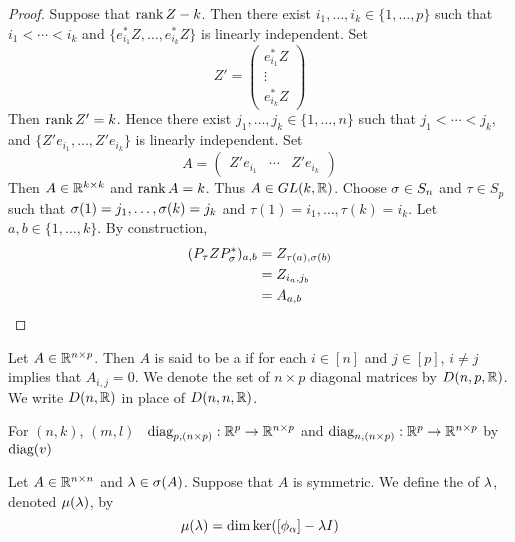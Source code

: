 \documentclass{book}
\begin{document}
	\begin{proof}
		Suppose that $\operatorname{\text{rank}} Z - k$. Then there exist $i_1, \ldots, i_k \in \{1, \ldots, p\}$ such that $i_1 < \cdots < i_k$ and $\{	e_{i_1}^* Z, \ldots, e_{i_k}^* Z \}$ is linearly independent. Set 
		$$ Z' = 
		\begin{pmatrix}
			e_{i_1}^* Z \\
			\vdots \\
			e_{i_k}^* Z 
		\end{pmatrix}
		$$
		Then $\operatorname{\text{rank}} Z' = k$. Hence there exist $j_1, \ldots, j_k \in \{1, \ldots, n\}$ such that $j_1 < \cdots < j_k$, and $\{Z' e_{i_1}, \ldots, Z' e_{i_k} \}$ is linearly independent. Set 
		$$ A = 
		\begin{pmatrix}
			Z' e_{i_1} & \cdots & Z' e_{i_k}
		\end{pmatrix}
		$$
		Then $A \in \mathbb{R}^{k \times k}$ and $\operatorname{\text{rank}} A = k$. Thus $A \in GL(k, \mathbb{R})$. Choose $\sigma \in S_n$ and $\tau \in S_p$ such that $\sigma(1) = j_1, \ldots, \sigma(k) = j_k$ and $\tau(1) = i_1, \ldots, \tau(k) = i_k$. Let $a,b \in \{1, \ldots, k\}$. By construction, 
		\begin{align*}
			(P_{\tau} Z P^*_{\sigma})_{a, b}
			& = Z_{\tau(a), \sigma(b)} \\
			& = Z_{i_a, j_b} \\
			& = A_{a, b}
		\end{align*}
		\end{proof}

	\begin{defn}
		Let $A \in \mathbb{R}^{n \times p}$. Then $A$ is said to be a  if for each $i \in [n]$ and $j \in [p]$, $i \neq j$ implies that $A_{i,j} = 0$. We denote the set of $n \times p$ diagonal  matrices by $D(n, p, \mathbb{R})$. We write $D(n, \mathbb{R})$ in place of $D(n, n, \mathbb{R})$.
	\end{defn}

	\begin{defn}
		For $(n, k)$, $(m, l)$ \ $\operatorname{\text{diag}}_{p, (n \times p)} : \mathbb{R}^p \rightarrow \mathbb{R}^{n \times p}$ and $\operatorname{\text{diag}}_{n, (n \times p)} : \mathbb{R}^p \rightarrow \mathbb{R}^{n \times p}$  by $\operatorname{\text{diag}}(v)$
		\tcb{FINISH!!!}
	\end{defn}


	\begin{defn}
		Let $A \in \mathbb{R}^{n \times n}$ and $\lambda \in \sigma(A)$. Suppose that $A$ is symmetric. We define the  of $\lambda$, denoted $\mu(\lambda)$, by 
		$$\mu(\lambda) = \dim \ker ([\phi_{\alpha}] - \lambda I)$$
	\end{defn}
\end{document}
